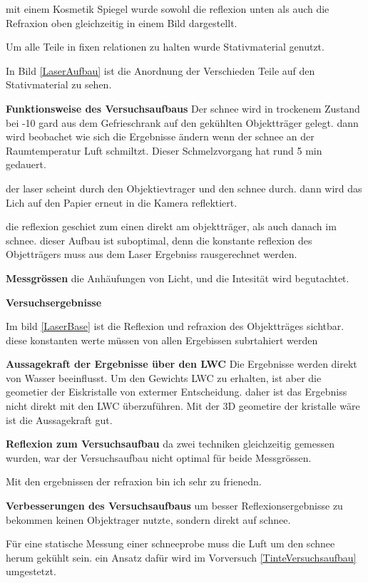 mit einem Kosmetik Spiegel wurde sowohl die reflexion unten als auch die Refraxion oben gleichzeitig in einem Bild dargestellt.

Um alle Teile in fixen relationen zu halten wurde Stativmaterial genutzt.

In Bild \ref{LaserAufbau} ist die Anordnung der Verschieden Teile auf den Stativmaterial zu sehen.

\textbf{Funktionsweise des Versuchsaufbaus}
Der schnee wird in trockenem Zustand bei -10 gard aus dem Gefrieschrank auf den gekühlten Objektträger gelegt. dann wird beobachet wie sich die Ergebnisse ändern wenn der schnee an der Raumtemperatur Luft schmiltzt. Dieser Schmelzvorgang hat rund 5 min gedauert.

der laser scheint durch den Objektievtrager und den schnee durch. dann wird das Lich auf den Papier erneut in die Kamera reflektiert.

die reflexion geschiet zum einen direkt am objektträger, als auch danach im schnee. dieser Aufbau ist suboptimal, denn die konstante reflexion des Objetträgers muss aus dem Laser Ergebniss rausgerechnet werden.

\textbf{Messgrössen}
die Anhäufungen von Licht, und die Intesität wird begutachtet.

\textbf{Versuchsergebnisse}

Im bild \ref{LaserBase} ist die Reflexion und refraxion des Objektträges sichtbar. diese konstanten werte müssen von allen Ergebissen subrtahiert werden

\textbf{Aussagekraft der Ergebnisse über den LWC} Die Ergebnisse werden direkt von Wasser beeinflusst. Um den Gewichts LWC zu erhalten, ist aber die geometier der Eiskristalle von extermer Entscheidung. daher ist das Ergebniss nicht direkt mit den LWC überzuführen. Mit der 3D geometire der kristalle wäre ist die Aussagekraft gut.

\textbf{Reflexion zum Versuchsaufbau}
da zwei techniken gleichzeitig gemessen wurden, war der Versuchsaufbau nicht optimal für beide Messgrössen.

Mit den ergebnissen der refraxion bin ich sehr zu frienedn.

\textbf{Verbesserungen des Versuchsaufbaus}
um besser Reflexionsergebnisse zu bekommen keinen Objektrager nutzte, sondern direkt auf schnee.

Für eine statische Messung einer schneeprobe muss die Luft um den schnee herum gekühlt sein. ein Ansatz dafür wird im Vorversuch \ref{TinteVersuchsaufbau} umgestetzt.


